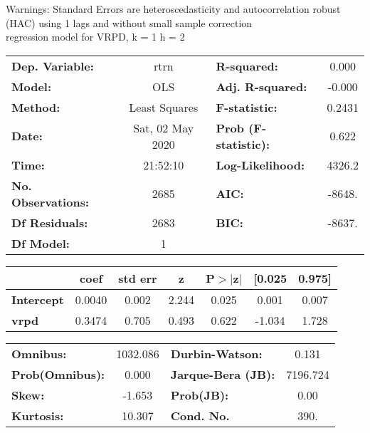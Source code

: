 Warnings: \newline
 [1] Standard Errors are heteroscedasticity and autocorrelation robust (HAC) using 1 lags and without small sample correction\\ 

regression model for VRPD, k = 1 h = 2\begin{center}
\begin{tabular}{lclc}
\toprule
\textbf{Dep. Variable:}    &       rtrn       & \textbf{  R-squared:         } &     0.000   \\
\textbf{Model:}            &       OLS        & \textbf{  Adj. R-squared:    } &    -0.000   \\
\textbf{Method:}           &  Least Squares   & \textbf{  F-statistic:       } &    0.2431   \\
\textbf{Date:}             & Sat, 02 May 2020 & \textbf{  Prob (F-statistic):} &    0.622    \\
\textbf{Time:}             &     21:52:10     & \textbf{  Log-Likelihood:    } &    4326.2   \\
\textbf{No. Observations:} &        2685      & \textbf{  AIC:               } &    -8648.   \\
\textbf{Df Residuals:}     &        2683      & \textbf{  BIC:               } &    -8637.   \\
\textbf{Df Model:}         &           1      & \textbf{                     } &             \\
\bottomrule
\end{tabular}
\begin{tabular}{lcccccc}
                   & \textbf{coef} & \textbf{std err} & \textbf{z} & \textbf{P$> |$z$|$} & \textbf{[0.025} & \textbf{0.975]}  \\
\midrule
\textbf{Intercept} &       0.0040  &        0.002     &     2.244  &         0.025        &        0.001    &        0.007     \\
\textbf{vrpd}      &       0.3474  &        0.705     &     0.493  &         0.622        &       -1.034    &        1.728     \\
\bottomrule
\end{tabular}
\begin{tabular}{lclc}
\textbf{Omnibus:}       & 1032.086 & \textbf{  Durbin-Watson:     } &    0.131  \\
\textbf{Prob(Omnibus):} &   0.000  & \textbf{  Jarque-Bera (JB):  } & 7196.724  \\
\textbf{Skew:}          &  -1.653  & \textbf{  Prob(JB):          } &     0.00  \\
\textbf{Kurtosis:}      &  10.307  & \textbf{  Cond. No.          } &     390.  \\
\bottomrule
\end{tabular}
\end{center}

